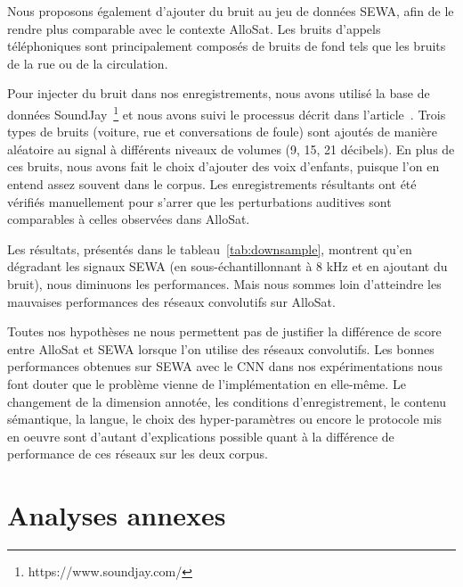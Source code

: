Nous proposons également d'ajouter du bruit au jeu de données SEWA, afin de le rendre plus comparable avec le contexte AlloSat. Les bruits d'appels téléphoniques sont principalement composés de bruits de fond tels que les bruits de la rue ou de la circulation.

Pour injecter du bruit dans nos enregistrements, nous avons utilisé la base de données SoundJay~\footnote{https://www.soundjay.com/} et nous avons suivi le processus décrit dans l'article~\cite{Alzqhoul2016}. Trois types de bruits (voiture, rue et conversations de foule) sont ajoutés de manière aléatoire au signal à différents niveaux de volumes (9, 15, 21 décibels). En plus de ces bruits, nous avons fait le choix d'ajouter des voix d'enfants, puisque l'on en entend assez souvent dans le corpus. Les enregistrements résultants ont été vérifiés manuellement pour s'arrer que les perturbations auditives sont comparables à celles observées dans AlloSat.



Les résultats, présentés dans le tableau~\ref{tab:downsample}, montrent qu'en dégradant les signaux SEWA (en sous-échantillonnant à 8 kHz et en ajoutant du bruit), nous diminuons les performances. Mais nous sommes loin d'atteindre les mauvaises performances des réseaux convolutifs sur AlloSat.

Toutes nos hypothèses ne nous permettent pas de justifier la différence de score entre AlloSat et SEWA lorsque l'on utilise des réseaux convolutifs. Les bonnes performances obtenues sur SEWA avec le CNN dans nos expérimentations nous font douter que le problème vienne de l'implémentation en elle-même. Le changement de la dimension annotée, les conditions d'enregistrement, le contenu sémantique, la langue, le choix des hyper-paramètres ou encore le protocole mis en oeuvre sont d'autant d'explications possible quant à la différence de performance de ces réseaux sur les deux corpus.

\section{Analyses annexes}

